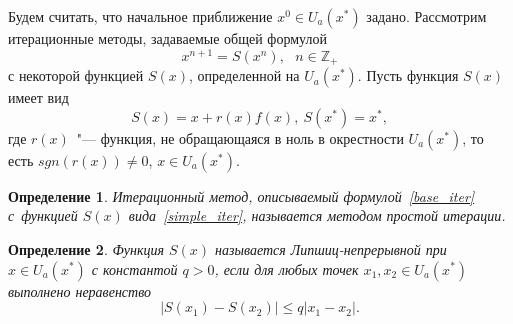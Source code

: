 \documentclass[11pt,a4paper,twoside]{report}
\numberwithin{equation}{section}
\newtheorem*{definition}{Определение}
\theoremstyle{definition}
\theoremstyle{plain}
\begin{document}
Будем считать, что начальное приближение $x^0 \in U_a(x^*)$ задано.
Рассмотрим итерационные методы, задаваемые общей формулой
%
\begin{equation}
%
    \label{base_iter}
    x^{n+1}=S(x^n), ~~~n\in \mathbb{Z_+}
%
\end{equation}
%
с некоторой функцией $S(x)$, определенной на $U_a(x^*)$.
Пусть функция $S(x)$ имеет вид
%
\begin{equation}
%
    \label{simple_iter}
    S(x)=x+r(x)f(x),
    ~S(x^*)=x^*,
%
\end{equation}
%
где $r(x)$~"--- функция, не обращающаяся в ноль
в окрестности $U_a(x^*)$, то есть $sgn(r(x)) \neq 0$, $x\in U_a(x^*)$.
%
\begin{definition}
%
    Итерационный метод, описываемый формулой~\eqref{base_iter} с~функцией
    $S(x)$ вида~\eqref{simple_iter}, называется методом простой итерации.
%
\end{definition}
%
%
\begin{definition}
%
    Функция $S(x)$ называется Липшиц-непрерывной при $x\in U_a(x^*)$
    с константой $q>0$, если для любых точек $x_1,x_2 \in U_a(x^*)$
    выполнено неравенство
    $$
        |S(x_1) - S(x_2)| \leqslant q|x_1 - x_2|.
    $$
%
\end{definition}
%
%
\end{document}
